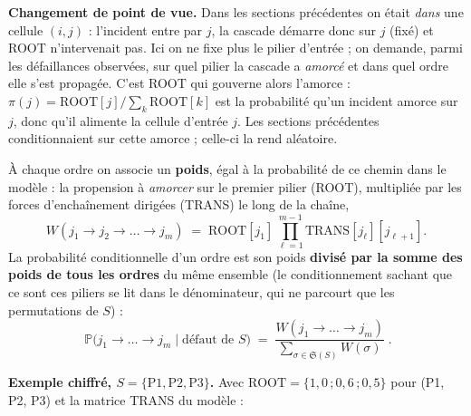 \documentclass[11pt,a4paper]{article}
\begin{document}
\noindent\textbf{Changement de point de vue.} Dans les sections précédentes on était \emph{dans}
une cellule $(i,j)$ : l'incident entre par $j$, la cascade démarre donc sur $j$ (fixé) et ROOT
n'intervenait pas. Ici on ne fixe plus le pilier d'entrée ; on demande, parmi les défaillances
observées, sur quel pilier la cascade a \emph{amorcé} et dans quel ordre elle s'est propagée.
C'est ROOT qui gouverne alors l'amorce : $\pi(j)=\text{ROOT}[j]/\sum_k\text{ROOT}[k]$ est la
probabilité qu'un incident amorce sur $j$, donc qu'il alimente la cellule d'entrée $j$. Les
sections précédentes conditionnaient sur cette amorce ; celle-ci la rend aléatoire.

À chaque ordre on associe un \textbf{poids}, égal à la probabilité de ce chemin dans le modèle :
la propension à \emph{amorcer} sur le premier pilier (ROOT), multipliée par les forces
d'enchaînement dirigées (TRANS) le long de la chaîne,
\begin{equation}
W(j_1 \to j_2 \to \dots \to j_m) \;=\; \text{ROOT}[j_1]\,\prod_{\ell=1}^{m-1}\text{TRANS}[j_\ell][j_{\ell+1}].
\end{equation}
La probabilité conditionnelle d'un ordre est son poids \textbf{divisé par la somme des poids de
tous les ordres} du même ensemble (le conditionnement \og{}sachant que ce sont ces piliers\fg{}
se lit dans le dénominateur, qui ne parcourt que les permutations de $S$) :
\begin{equation}
\boxed{\;\mathbb P\big(j_1 \to \dots \to j_m \;\big|\; \text{défaut de } S\big)
\;=\; \frac{W(j_1 \to \dots \to j_m)}{\displaystyle\sum_{\sigma \in \mathfrak S(S)} W(\sigma)}\;.}
\end{equation}

\noindent\textbf{Exemple chiffré, $S=\{\text{P1},\text{P2},\text{P3}\}$.} Avec
$\text{ROOT}=\{1{,}0\,;0{,}6\,;0{,}5\}$ pour (P1, P2, P3) et la matrice TRANS du modèle :
\end{document}

